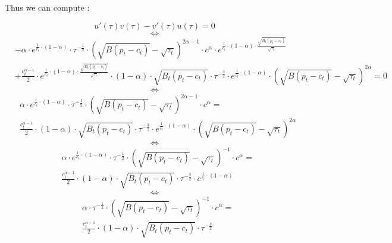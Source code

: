 \documentclass{article}
\begin{document}
Thus we can compute : 

\begin{equation*}
    u'(\tau)v(\tau)-v'(\tau)u(\tau)=0
\end{equation*}
$$\iff$$
\begin{equation*}
    \begin{split}
    & -\alpha\cdot e^{\frac{1}{c_{t}}\cdot\left(1-\alpha\right)}\cdot \tau^{-\frac{1}{2}}\cdot \left(\sqrt{B(p_{t}-c_{t})}-\sqrt{\tau_{t}}\right)^{2\alpha-1} \cdot  c^{\alpha}\cdot e^{\frac{1}{c_{t}}\cdot(1-\alpha)\cdot\frac{\sqrt{B_{t}(p_{t}-c_{t})}}{\sqrt{\tau_{t}}}} \\
    & +\frac{c_{t}^{\alpha-1}}{2}\cdot e^{\frac{1}{c_{t}}\cdot(1-\alpha)\cdot\frac{\sqrt{B_{t}(p_{t}-c_{t})}}{\sqrt{\tau_{t}}}}\cdot (1-\alpha)\cdot\sqrt{B_{t}(p_{t}-c_{t})}\cdot\tau^{-\frac{3}{2}}\cdot e^{\frac{1}{c_{t}}\cdot\left(1-\alpha\right)}\cdot\left(\sqrt{B(p_{t}-c_{t})}-\sqrt{\tau_{t}}\right)^{2\alpha}=0
    \end{split}
\end{equation*}
$$\iff$$
\begin{equation*}
    \begin{split}
    & \alpha\cdot e^{\frac{1}{c_{t}}\cdot\left(1-\alpha\right)}\cdot \tau^{-\frac{1}{2}}\cdot \left(\sqrt{B(p_{t}-c_{t})}-\sqrt{\tau_{t}}\right)^{2\alpha-1} \cdot  c^{\alpha} = \\
    & \frac{c_{t}^{\alpha-1}}{2}\cdot (1-\alpha)\cdot\sqrt{B_{t}(p_{t}-c_{t})}\cdot\tau^{-\frac{3}{2}}\cdot e^{\frac{1}{c_{t}}\cdot\left(1-\alpha\right)}\cdot\left(\sqrt{B(p_{t}-c_{t})}-\sqrt{\tau_{t}}\right)^{2\alpha}
    \end{split}
\end{equation*}
$$\iff$$
\begin{equation*}
    \begin{split}
    & \alpha\cdot e^{\frac{1}{c_{t}}\cdot\left(1-\alpha\right)}\cdot \tau^{-\frac{1}{2}}\cdot \left(\sqrt{B(p_{t}-c_{t})}-\sqrt{\tau_{t}}\right)^{-1} \cdot  c^{\alpha} = \\
    & \frac{c_{t}^{\alpha-1}}{2}\cdot (1-\alpha)\cdot\sqrt{B_{t}(p_{t}-c_{t})}\cdot\tau^{-\frac{3}{2}}\cdot e^{\frac{1}{c_{t}}\cdot\left(1-\alpha\right)}
    \end{split}
\end{equation*}
$$\iff$$
\begin{equation*}
    \begin{split}
    & \alpha\cdot \tau^{-\frac{1}{2}}\cdot \left(\sqrt{B(p_{t}-c_{t})}-\sqrt{\tau_{t}}\right)^{-1} \cdot  c^{\alpha} = \\
    & \frac{c_{t}^{\alpha-1}}{2}\cdot (1-\alpha)\cdot\sqrt{B_{t}(p_{t}-c_{t})}\cdot\tau^{-\frac{3}{2}} 
    \end{split}
\end{equation*}
\end{document}

